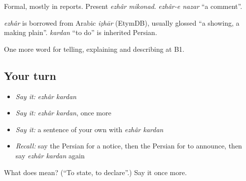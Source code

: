 Formal, mostly in reports. Present \emph{ezhâr mikonad}. \emph{ezhâr-e nazar} \textquotedblleft{}a comment\textquotedblright{}.

\begin{cousinweb}
\emph{ezhâr} is borrowed from Arabic \emph{iẓhār} (EtymDB), usually glossed \textquotedblleft{}a showing, a making plain\textquotedblright{}. \emph{kardan} \textquotedblleft{}to do\textquotedblright{} is inherited Persian.
\end{cousinweb}

\begin{grammarlens}[title={What you've built}]
One more word for telling, explaining and describing at B1.
\end{grammarlens}

\subsection*{Your turn}
\begin{itemize}
\raggedright
  \item \emph{Say it:} \emph{ezhâr kardan}
  \item \emph{Say it:} \emph{ezhâr kardan}, once more
  \item \emph{Say it:} a sentence of your own with \emph{ezhâr kardan}
  \item \emph{Recall:} say the Persian for a notice, then the Persian for to announce, then say \emph{ezhâr kardan} again
\end{itemize}

\begin{tcolorbox}[breakable,colback=teal!4,colframe=teal!35!black,title={Before you move on}]
What does   mean? (\textquotedblleft{}To state, to declare\textquotedblright{}.) Say it once more.
\end{tcolorbox}

